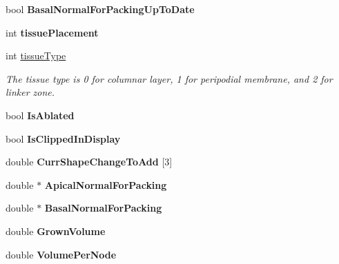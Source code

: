 \begin{DoxyCompactItemize}
\item 
\hypertarget{classShapeBase_a189180583fb224af63900411b2da53c6}{}bool {\bfseries Basal\+Normal\+For\+Packing\+Up\+To\+Date}\label{classShapeBase_a189180583fb224af63900411b2da53c6}

\item 
\hypertarget{classShapeBase_aff63b1fcb823bbfdb5b19fe78dea59b8}{}int {\bfseries tissue\+Placement}\label{classShapeBase_aff63b1fcb823bbfdb5b19fe78dea59b8}

\item 
\hypertarget{classShapeBase_a1d56f7eb3fed744adc268bc4da7a790f}{}int \hyperlink{classShapeBase_a1d56f7eb3fed744adc268bc4da7a790f}{tissue\+Type}\label{classShapeBase_a1d56f7eb3fed744adc268bc4da7a790f}

\begin{DoxyCompactList}\small\item\em The tissue type is 0 for columnar layer, 1 for peripodial membrane, and 2 for linker zone. \end{DoxyCompactList}\item 
\hypertarget{classShapeBase_a4f09d39d079bfe95ea7c25f5d3de6c09}{}bool {\bfseries Is\+Ablated}\label{classShapeBase_a4f09d39d079bfe95ea7c25f5d3de6c09}

\item 
\hypertarget{classShapeBase_a6f5e25bc9b4376c0aa28aec59af6cf2f}{}bool {\bfseries Is\+Clipped\+In\+Display}\label{classShapeBase_a6f5e25bc9b4376c0aa28aec59af6cf2f}

\item 
\hypertarget{classShapeBase_a3d48903871978d77a77cb77f569975c0}{}double {\bfseries Curr\+Shape\+Change\+To\+Add} \mbox{[}3\mbox{]}\label{classShapeBase_a3d48903871978d77a77cb77f569975c0}

\item 
\hypertarget{classShapeBase_ab84cbf988437cd20fcceee7a24d0c3a8}{}double $\ast$ {\bfseries Apical\+Normal\+For\+Packing}\label{classShapeBase_ab84cbf988437cd20fcceee7a24d0c3a8}

\item 
\hypertarget{classShapeBase_a87f03cc35ac66eeb14487c5f33097891}{}double $\ast$ {\bfseries Basal\+Normal\+For\+Packing}\label{classShapeBase_a87f03cc35ac66eeb14487c5f33097891}

\item 
\hypertarget{classShapeBase_a8a1bafcaf21f040dd137abfe434a75a9}{}double {\bfseries Grown\+Volume}\label{classShapeBase_a8a1bafcaf21f040dd137abfe434a75a9}

\item 
\hypertarget{classShapeBase_a59943ecb9f8ec139c0f564c1fb91d876}{}double {\bfseries Volume\+Per\+Node}\label{classShapeBase_a59943ecb9f8ec139c0f564c1fb91d876}


\end{DoxyCompactItemize}
